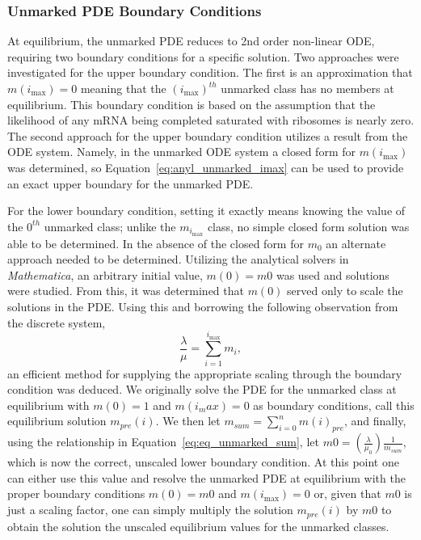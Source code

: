 \documentclass[review]{elsarticle}
\newcommand{\imax}{\ensuremath{i_{\max}}\xspace}
\begin{document}
\subsubsection{Unmarked PDE Boundary Conditions}
At equilibrium, the unmarked PDE reduces to 2nd order non-linear ODE, requiring two boundary conditions for a specific solution.
Two approaches were investigated for the upper boundary condition.
The first is an approximation that $m(\imax)=0$ meaning  that the $(\imax)^{th}$ unmarked class has no members at equilibrium.
This boundary condition is based on the assumption that the likelihood of any mRNA being completed saturated with ribosomes is nearly zero.
The second approach for the upper boundary condition utilizes a result from the ODE system.
Namely, in the unmarked ODE system a closed form for $m(\imax)$ was determined, so Equation~\ref{eq:anyl_unmarked_imax} can be used to provide an exact upper boundary for the unmarked PDE.

For the lower boundary condition, setting it exactly means knowing the value of the $0^{th}$ unmarked class; unlike the $m_{\imax}$ class, no simple closed form solution was able to be determined.
In the absence of the closed form for $m_0$ an alternate approach needed to be determined.
Utilizing the analytical solvers in \emph{Mathematica}, an arbitrary initial value, $m(0)=m0$ was used and solutions were studied.
From this, it was determined that $m(0)$ served only to scale the solutions in the PDE.
Using this and borrowing the following observation from the discrete system,
\begin{equation}\label{eq:eq_unmarked_sum}
\frac{\lambda}{\mu}=\sum_{i=1}^{\imax}m_{i},
\end{equation}
an efficient method for supplying the appropriate scaling through the boundary condition was deduced.
We originally solve the PDE for the unmarked class at equilibrium with $m(0)=1$ and $m(i_max)=0$ as boundary conditions, call this equilibrium solution $m_{pre}(i)$.
We then let $m_{sum}=\sum_{i=0}^{n}m(i)_{pre}$, and finally, using the relationship in Equation~\ref{eq:eq_unmarked_sum}, let $m0=\left(\frac{\lambda}{\mu_0}\right)\frac{1}{m_{sum}}$, which is now the correct, unscaled lower boundary condition.
At this point one can either use this value and resolve the unmarked PDE at equilibrium with the proper boundary conditions $m(0)=m0$ and $m(\imax)=0$ or, given that $m0$ is just a scaling factor, one can simply multiply the solution $m_{pre}(i)$ by $m0$ to obtain the solution the unscaled equilibrium values for the unmarked classes.
\end{document}
